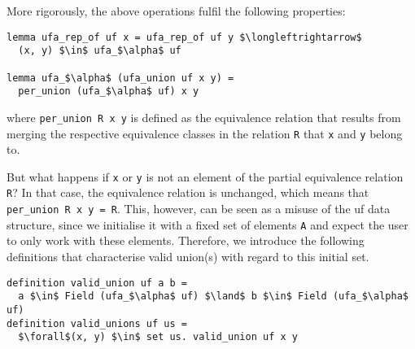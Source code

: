 \documentclass[
  sigplan,
  10pt,
  anonymous,
  review,
  ]{acmart}
\begin{document}
More rigorously, the above operations fulfil the following properties:
\begin{lstlisting}
lemma ufa_rep_of uf x = ufa_rep_of uf y $\longleftrightarrow$
  (x, y) $\in$ ufa_$\alpha$ uf

lemma ufa_$\alpha$ (ufa_union uf x y) =
  per_union (ufa_$\alpha$ uf) x y
\end{lstlisting}
where \lstinline!per_union R x y! is defined as the equivalence relation that results from merging the respective equivalence classes in the relation \lstinline|R| that \lstinline!x! and \lstinline!y! belong to.

But what happens if \lstinline!x! or \lstinline!y! is not an element of the partial equivalence relation \lstinline|R|?
In that case, the equivalence relation is unchanged, which means that \lstinline|per_union R x y = R|.
This, however, can be seen as a misuse of the \acrshort{uf} data structure, since we initialise it with a fixed set of elements \lstinline|A| and expect the user to only work with these elements.
Therefore, we introduce the following definitions that characterise valid union(s) with regard to this initial set.
\begin{lstlisting}
definition valid_union uf a b =
  a $\in$ Field (ufa_$\alpha$ uf) $\land$ b $\in$ Field (ufa_$\alpha$ uf)
definition valid_unions uf us =
  $\forall$(x, y) $\in$ set us. valid_union uf x y
\end{lstlisting}
\end{document}
